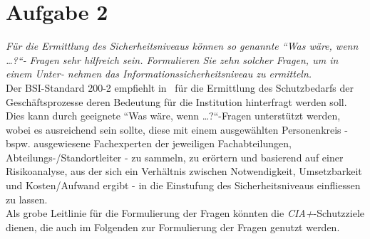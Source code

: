 \chapter{Aufgabe 2}

\textit{Für die Ermittlung des Sicherheitsniveaus können so genannte ``Was wäre, wenn \ldots{?}``‐
Fragen sehr hilfreich sein. Formulieren Sie zehn solcher Fragen, um in einem Unter‐
nehmen das Informationssicherheitsniveau zu ermitteln.}\\

\noindent
Der BSI-Standard 200-2 empfiehlt in~\cite[110]{BSI200-2} für die Ermittlung des Schutzbedarfs der Geschäftsprozesse deren Bedeutung für die Institution hinterfragt werden soll.
Dies kann durch geeignete ``Was wäre, wenn \ldots{?}``-Fragen unterstützt werden, wobei es ausreichend sein sollte, diese mit einem ausgewählten Personenkreis - bspw. ausgewiesene Fachexperten der jeweiligen Fachabteilungen, Abteilungs-/Standortleiter - zu sammeln, zu erörtern und basierend auf einer Risikoanalyse, aus der sich ein Verhältnis zwischen Notwendigkeit, Umsetzbarkeit und Kosten/Aufwand ergibt - in die Einstufung des Sicherheitsniveaus einfliessen zu lassen.\\

\noindent
Als grobe Leitlinie für die Formulierung der Fragen könnten die \textit{CIA+}-Schutzziele dienen, die auch im Folgenden zur Formulierung der Fragen genutzt werden.

